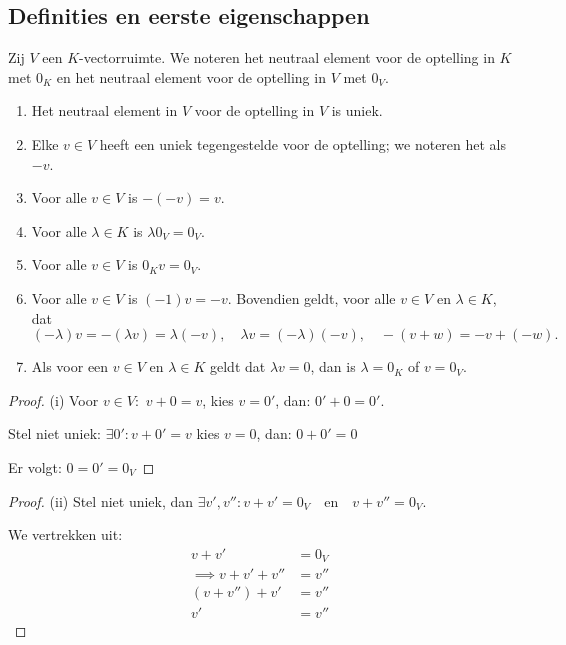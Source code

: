 \subsection{Definities en eerste eigenschappen}

\begin{lemma}[2.1.3]
    Zij $V$ een $K$-vectorruimte. We noteren het neutraal element voor de optelling in $K$ met $0_K$ en het neutraal element voor de optelling in $V$ met $0_V$.
    \begin{enumerate}
        \item[(i)] Het neutraal element in $V$ voor de optelling in $V$ is uniek.
        \item[(ii)] Elke $v \in V$ heeft een uniek tegengestelde voor de optelling; we noteren het als $-v$.
        \item[(iii)] Voor alle $v \in V$ is $-(-v) = v$.
        \item[(iv)] Voor alle $\lambda \in K$ is $\lambda 0_V = 0_V$.
        \item[(v)] Voor alle $v \in V$ is $0_K v = 0_V$.
        \item[(vi)] Voor alle $v \in V$ is $(-1)v = -v$. Bovendien geldt, voor alle $v \in V$ en $\lambda \in K$, dat
        \[ (-\lambda)v = -(\lambda v) = \lambda(-v), \quad \lambda v = (-\lambda)(-v), \quad -(v + w) = -v + (-w). \]
        \item[(vii)] Als voor een $v \in V$ en $\lambda \in K$ geldt dat $\lambda v = 0$, dan is $\lambda = 0_K$ of $v = 0_V$.
    \end{enumerate}
\end{lemma}
\begin{proof}(i)
    Voor \(v \in V: \) \(v + 0 = v \), kies \(v=0'\), dan:
     \(0'+ 0 = 0'.\)

    Stel niet uniek:
    \(\exists 0' : v + 0' = v\) kies \(v = 0\), dan:
    \(0 + 0' = 0\)

    Er volgt: \(0 = 0' = 0_V\)
\end{proof}
\begin{proof}(ii)
    Stel niet uniek, dan \(\exists v', v'': v + v' = 0_V \quad \text{en} \quad v + v'' = 0_V\).

    We vertrekken uit:
    \begin{align*}
        v + v'
        &= 0_V \\
        \implies
        v + v'+ v'' &= v'' \\
        (v+v'')+v' &= v'' \\
        v'&=v''
    \end{align*}
\end{proof}
